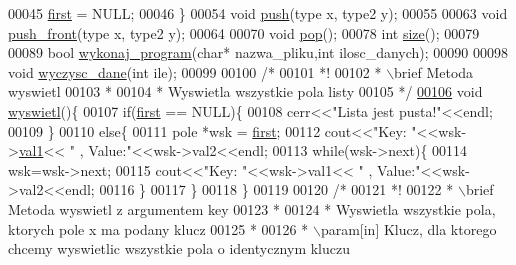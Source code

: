 \begin{DoxyCode}
00045     \hyperlink{class_lista_a7b19bc8c210d1bac9bb7608a638a8b27}{first} = NULL;
00046   \}
00054   \textcolor{keywordtype}{void} \hyperlink{class_lista_a3b89123537e441b622630a1654afff3c}{push}(type x, type2 y);
00055 
00063   \textcolor{keywordtype}{void} \hyperlink{class_lista_aa0a993823fa462fbe6d6072a61f1a1f3}{push\_front}(type x, type2 y);
00064 
00070   \textcolor{keywordtype}{void} \hyperlink{class_lista_ac3c0760924a0cae03f837a581640d32b}{pop}();
00078   \textcolor{keywordtype}{int} \hyperlink{class_lista_a2951b209d8977cc61a570ce46fff1e82}{size}();
00079 
00089   \textcolor{keywordtype}{bool} \hyperlink{class_program_ac396401ba5cade863d0e6acb727bec4e}{wykonaj\_program}(\textcolor{keywordtype}{char}* nazwa\_pliku,\textcolor{keywordtype}{int} ilosc\_danych);
00090 
00098   \textcolor{keywordtype}{void} \hyperlink{class_lista_aee6110c6d9d5b36fe5342f2f8968d5ad}{wyczysc\_dane}(\textcolor{keywordtype}{int} ile);
00099 
00100   \textcolor{comment}{/*}
00101 \textcolor{comment}{   *!}
00102 \textcolor{comment}{   * \(\backslash\)brief Metoda wyswietl}
00103 \textcolor{comment}{   *}
00104 \textcolor{comment}{   * Wyswietla wszystkie pola listy}
00105 \textcolor{comment}{   */}
\hypertarget{lista_8hh_source_l00106}{}\hyperlink{class_lista_aca842e81998c231283f8d82b3c17fbc8}{00106}   \textcolor{keywordtype}{void} \hyperlink{class_lista_aca842e81998c231283f8d82b3c17fbc8}{wyswietl}()\{
00107     \textcolor{keywordflow}{if}(\hyperlink{class_lista_a7b19bc8c210d1bac9bb7608a638a8b27}{first} == NULL)\{
00108       cerr<<\textcolor{stringliteral}{"Lista jest pusta!"}<<endl;
00109     \}
00110     \textcolor{keywordflow}{else}\{
00111       pole *wsk = \hyperlink{class_lista_a7b19bc8c210d1bac9bb7608a638a8b27}{first};
00112       cout<<\textcolor{stringliteral}{"Key: "}<<wsk->\hyperlink{struct_lista_1_1pole_a442b458124564aa83caf2187b433abf7}{val1}<< \textcolor{stringliteral}{" , Value:"}<<wsk->val2<<endl;
00113       \textcolor{keywordflow}{while}(wsk->next)\{
00114     wsk=wsk->next;
00115     cout<<\textcolor{stringliteral}{"Key: "}<<wsk->val1<< \textcolor{stringliteral}{" , Value:"}<<wsk->val2<<endl;
00116       \}
00117     \}
00118   \}
00119 
00120   \textcolor{comment}{/*}
00121 \textcolor{comment}{   *!}
00122 \textcolor{comment}{   * \(\backslash\)brief Metoda wyswietl z argumentem key}
00123 \textcolor{comment}{   *}
00124 \textcolor{comment}{   * Wyswietla wszystkie pola, ktorych pole x ma podany klucz}
00125 \textcolor{comment}{   *}
00126 \textcolor{comment}{   * \(\backslash\)param[in] Klucz, dla ktorego chcemy wyswietlic wszystkie pola o identycznym kluczu}

\end{DoxyCode}
